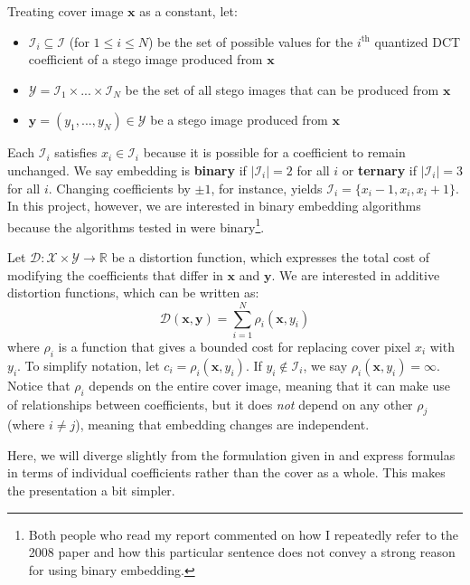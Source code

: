 \documentclass[11pt,a4paper,twoside,openright]{report}
\begin{document}
Treating cover image $\bm{x}$ as a constant, let:
\begin{itemize}
	\item $\mathcal{I}_i \subseteq \mathcal{I}$ (for $1 \leq i \leq N$) be the set of possible values for the $i^{\text{th}}$ quantized DCT coefficient of a stego image produced from $\bm{x}$
	\item $\mathcal{Y} =  \mathcal{I}_1 \times ... \times \mathcal{I}_N$ be the set of all stego images that can be produced from $\bm{x}$
	\item $\bm{y} = (y_1,...,y_N) \in \mathcal{Y}$ be a stego image produced from $\bm{x}$
\end{itemize}

Each $\mathcal{I}_i$ satisfies $x_i \in \mathcal{I}_i$ because it is possible for a coefficient to remain unchanged. We say embedding is \textbf{binary} if $| \mathcal{I}_i | = 2$ for all $i$ or \textbf{ternary} if $| \mathcal{I}_i | = 3$ for all $i$. Changing coefficients by $\pm 1$, for instance, yields $\mathcal{I}_i = \{ x_i-1, x_i, x_i+1 \}$. In this project, however, we are interested in binary embedding algorithms because the algorithms tested in \cite{2008-paper} were binary\footnote{Both people who read my report commented on how I repeatedly refer to the 2008 paper and how this particular sentence does not convey a strong reason for using binary embedding.}.

Let $\mathcal{D} : \mathcal{X} \times \mathcal{Y} \to \mathbb{R}$ be a distortion function, which expresses the total cost of modifying the coefficients that differ in $\bm{x}$ and $\bm{y}$. We are interested in additive distortion functions, which can be written as:
\begin{equation*}
	\mathcal{D}(\bm{x},\bm{y}) = \sum_{i=1}^N \rho_i(\bm{x},y_i)
\end{equation*}
where $\rho_i$ is a function that gives a bounded cost for replacing cover pixel $x_i$ with $y_i$. To simplify notation, let $c_i = \rho_i(\bm{x},y_i)$. If $y_i \notin \mathcal{I}_i$, we say $\rho_i(\bm{x},y_i) = \infty$. Notice that $\rho_i$ depends on the entire cover image, meaning that it can make use of relationships between coefficients, but it does \textit{not} depend on any other $\rho_j$ (where $i \neq j$), meaning that embedding changes are independent.

Here, we will diverge slightly from the formulation given in \cite{stc-paper} and express formulas in terms of individual coefficients rather than the cover as a whole. This makes the presentation a bit simpler.
\end{document}
